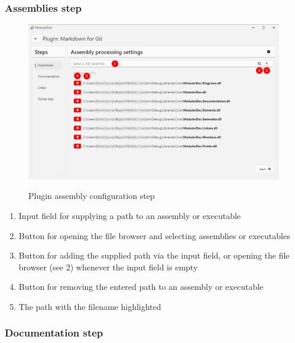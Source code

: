 \subsubsection{Assemblies step}

\begin{figure}[H]
    \includegraphics[width=\linewidth]{img/modularDocAssemblies.png}
    \label{fig:modularAssemblies}
    \caption{Plugin assembly configuration step}
\end{figure}

\begin{enumerate}
    \item Input field for supplying a path to an assembly or executable
    \item Button for opening the file browser and selecting assemblies or executables
    \item Button for adding the supplied path via the input field, or opening the file browser (see 2) whenever the input field is empty
    \item Button for removing the entered path to an assembly or executable
    \item The path with the filename highlighted
\end{enumerate}

\subsubsection{Documentation step}

